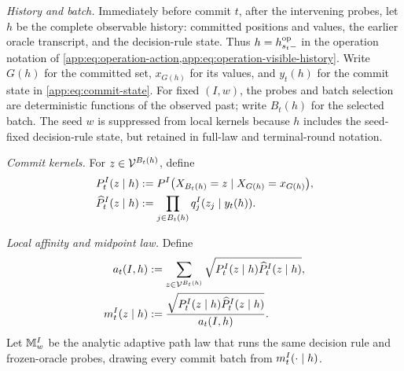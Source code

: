 \begin{definition*}
\emph{History and batch.}
Immediately before commit \(t\), after the intervening probes, let \(h\)
be the complete observable history: committed positions and values,
the earlier oracle transcript, and the decision-rule state.
Thus $h=\OpVisibleHistory{s_t}$ in the operation notation of
\cref{app:eq:operation-action,app:eq:operation-visible-history}.
Write \(G(h)\) for the committed set, \(x_{G(h)}\) for its values, and
\(y_t(h)\) for the commit state in \eqref{app:eq:commit-state}.
For fixed \((I,w)\), the probes and batch selection are deterministic
functions of the observed past; write \(B_t(h)\) for the selected batch.
The seed \(w\) is suppressed from local kernels because \(h\) includes
the seed-fixed decision-rule state, but retained in full-law and
terminal-round notation.

\emph{Commit kernels.}
For \(z\in\Vocab^{B_t(h)}\), define
\begin{align}
 \HardExactBatchLaw{t}{I}(z\mid h)
 &:=\HardTargetLaw{I}\bigl(
   X_{B_t(h)}=z\mid X_{G(h)}=x_{G(h)}
  \bigr),
 \label{app:eq:hard-exact-batch-law}\\
 \HardProductBatchLaw{t}{I}(z\mid h)
 &:=\prod_{j\in B_t(h)}\HardOracleRowMass{I}{y_t(h)}{j}{z_j}.
 \label{app:eq:hard-product-batch-law}
\end{align}

\emph{Local affinity and midpoint law.}
Define
\begin{align}
 \HardLocalAffinity{t}{I,h}
 &:=\sum_{z\in\Vocab^{B_t(h)}}
    \sqrt{
     \HardExactBatchLaw{t}{I}(z\mid h)
     \HardProductBatchLaw{t}{I}(z\mid h)},
 \label{app:eq:hard-local-affinity}\\
 \HardMidpointKernel{t}{I}(z\mid h)
 &:=\frac{
    \sqrt{
     \HardExactBatchLaw{t}{I}(z\mid h)
     \HardProductBatchLaw{t}{I}(z\mid h)}}
   {\HardLocalAffinity{t}{I,h}}.
 \label{app:eq:hard-midpoint-kernel}
\end{align}
Let \(\HardMidpointLaw{I}{w}\) be the analytic adaptive path law that runs
the same decision rule and frozen-oracle probes, drawing every commit
batch from \(\HardMidpointKernel{t}{I}(\cdot\mid h)\).
\end{definition*}

